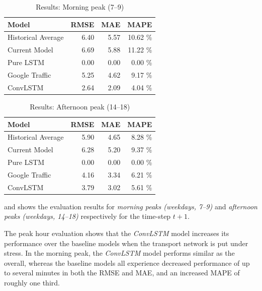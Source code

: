 \documentclass[preprint,11pt,5p,twocolumn]{elsarticle}
\begin{document}
\begin{table}[!ht]
  \center
  \begin{tabular}{l|rrr}
  Model &  RMSE &  MAE &  MAPE \\
  \hline
  \hline
  Historical Average &        6.40 &       5.57 &     10.62 \% \\ \hline
  Current Model      &        6.69 &       5.88 &     11.22 \% \\ \hline
  Pure LSTM          &        0.00 &       0.00 &      0.00 \% \\ \hline
  Google Traffic     &        5.25 &       4.62 &      9.17 \% \\ \hline
  ConvLSTM           &        2.64 &       2.09 &      4.04 \% \\ \hline
  \end{tabular}
  \caption{Results: Morning peak (7--9)}
  \label{tab:morning_peak}
  
\end{table}

\begin{table}[!ht]
  \center
  \begin{tabular}{l|rrr}
  Model &  RMSE &  MAE &  MAPE \\
  \hline
  \hline
  Historical Average &    5.90 &   4.65 &  8.28 \% \\ \hline
  Current Model      &    6.28 &   5.20 &  9.37 \% \\ \hline
  Pure LSTM          &    0.00 &   0.00 &  0.00 \% \\ \hline
  Google Traffic     &    4.16 &   3.34 &  6.21 \% \\ \hline
  ConvLSTM           &    3.79 &   3.02 &  5.61 \% \\ \hline
  \end{tabular}
  \caption{Results: Afternoon peak (14--18)}
  \label{tab:afternoon_peak}  
\end{table}

 and  shows the evaluation results for \emph{morning peaks (weekdays, 7--9)} and \emph{afternoon peaks (weekdays, 14--18)} respectively for the time-step $t + 1$.

The peak hour evaluation shows that the \emph{ConvLSTM} model increases its performance over the baseline models when the transport network is put under stress. In the morning peak, the \emph{ConvLSTM} model performs similar as the overall, whereas the baseline models all experience decreased performance of up to several minutes in both the RMSE and MAE, and an increased MAPE of roughly one third. 
\end{document}

